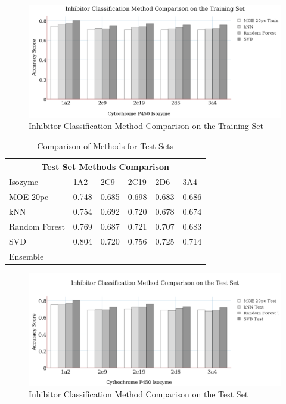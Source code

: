 \begin{figure}[!h]
\includegraphics[width=1\textwidth]{../img/method_comparison_training_set.png}
\caption{Inhibitor Classification Method Comparison on the Training Set}
\end{figure}



\begin{table}[!h]
\begin{tabular}{|l|l|l|l|l|l|}
\hline
\multicolumn{6}{|c|}{Test Set Methods Comparison}     \\ \hline
Isozyme       & 1A2   & 2C9   & 2C19  & 2D6   & 3A4   \\ \hline
MOE 20pc      & 0.748 & 0.685 & 0.698 & 0.683 & 0.686 \\ \hline
kNN           & 0.754 & 0.692 & 0.720 & 0.678 & 0.674 \\ \hline
Random Forest & 0.769 & 0.687 & 0.721 & 0.707 & 0.683 \\ \hline
SVD           & 0.804 & 0.720 & 0.756 & 0.725 & 0.714 \\ \hline
Ensemble      &       &       &       &       &       \\ \hline
\end{tabular}
\caption{Comparison of Methods for Test Sets}
\end{table}

\begin{figure}[!h]
\includegraphics[width=1\textwidth]{../img/method_comparison_test_set.png}
\caption{Inhibitor Classification Method Comparison on the Test Set}
\end{figure}






